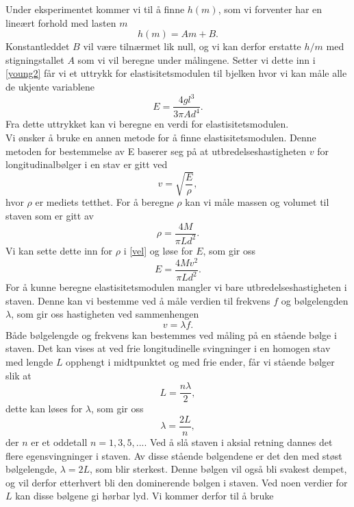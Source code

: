 \documentclass[%
 reprint,
 amsmath,amssymb,
 aps,
]{revtex4-1}
\begin{document}
Under eksperimentet kommer vi til å finne $h(m)$, som vi forventer har en lineært forhold med lasten $m$
\begin{equation}
  h(m) = Am + B.
\end{equation}
Konstantleddet $B$ vil være tilnærmet lik null, og vi kan derfor erstatte $h/m$ med stigningstallet $A$ som vi vil beregne under målingene. Setter vi dette inn i \eqref{young2} får vi et uttrykk for elastisitetsmodulen til bjelken hvor vi kan måle alle de ukjente variablene
\begin{equation}
  E = \frac{4gl^3}{3\pi Ad^4}. \label{young3}
\end{equation}
Fra dette uttrykket kan vi beregne en verdi for elastisitetsmodulen.\\Vi ønsker å bruke en annen metode for å finne elastisitetsmodulen. Denne metoden for bestemmelse av E baserer seg på at utbredelseshastigheten $v$ for longitudinalbølger i en stav er gitt ved
\begin{equation*}
  v = \sqrt{\frac{E}{\rho}},\label{vel}
\end{equation*}
hvor $\rho$ er mediets tetthet. For å beregne $\rho$ kan vi måle massen og volumet til staven som er gitt av
\begin{equation}
  \rho = \frac{4M}{\pi L d^2}.
\end{equation}
Vi kan sette dette inn for $\rho$ i \eqref{vel} og løse for $E$, som gir oss
\begin{equation}
  E = \frac{4Mv^2}{\pi L d^2}.\label{elast}
\end{equation}
For å kunne beregne elastisitetsmodulen mangler vi bare utbredelseshastigheten i staven. Denne kan vi bestemme ved å måle verdien til frekvens $f$ og bølgelengden $\lambda$, som gir oss hastigheten ved sammenhengen
\begin{equation}
  v = \lambda f.\label{vlf}
\end{equation}
Både bølgelengde og frekvens kan bestemmes ved måling på en stående bølge i staven.
Det kan vises at ved frie longitudinelle svingninger i en homogen stav med lengde $L$ opphengt i midtpunktet og med frie ender, får vi stående bølger slik at
\begin{equation}
  L = \frac{n\lambda}{2},
\end{equation}
dette kan løses for $\lambda$, som gir oss
\begin{equation}
  \lambda = \frac{2L}{n},
\end{equation}
der $n$ er et oddetall $n = 1, 3, 5, ...$. Ved å slå staven i aksial retning dannes det flere egensvingninger i staven. Av disse stående bølgendene er det den med støst bølgelengde, $\lambda = 2L$, som blir sterkest. Denne bølgen vil også bli svakest dempet, og vil derfor etterhvert bli den dominerende bølgen i staven. Ved noen verdier for $L$ kan disse bølgene gi hørbar lyd. Vi kommer derfor til å bruke
\end{document}

